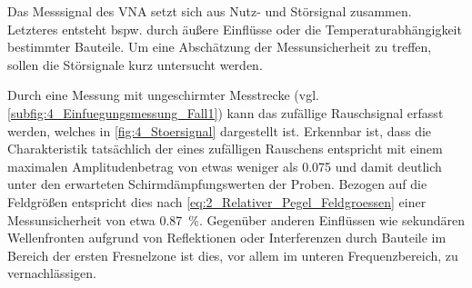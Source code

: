 

Das Messsignal des VNA setzt sich aus Nutz- und Störsignal zusammen. Letzteres entsteht bspw. durch äußere Einflüsse oder die Temperaturabhängigkeit bestimmter Bauteile. Um eine Abschätzung der Messunsicherheit zu treffen, sollen die Störsignale kurz untersucht werden.
\par
\vspace{\linespace}
Durch eine Messung mit ungeschirmter Messtrecke (vgl. \Abb\ref{subfig:4_Einfuegungsmessung_Fall1}) kann das zufällige Rauschsignal erfasst werden, welches in \Abb\ref{fig:4_Stoersignal} dargestellt ist. Erkennbar ist, dass die Charakteristik tatsächlich der eines zufälligen Rauschens entspricht mit einem maximalen Amplitudenbetrag von etwas weniger als \SI{0.075}{\Dezibel} und damit deutlich unter den erwarteten Schirmdämpfungswerten der Proben. Bezogen auf die Feldgrößen entspricht dies nach \Gleichung\eqref{eq:2_Relativer_Pegel_Feldgroessen} einer Messunsicherheit von etwa \SI{0.87}{\percent}. Gegenüber anderen Einflüssen wie sekundären Wellenfronten aufgrund von Reflektionen oder Interferenzen durch Bauteile im Bereich der ersten Fresnelzone ist dies, vor allem im unteren Frequenzbereich, zu vernachlässigen. 
\par



